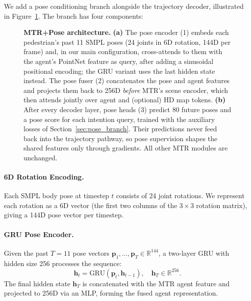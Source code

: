 \documentclass{article} %
\begin{document}
We add a pose conditioning branch alongside the trajectory decoder, illustrated
in Figure~\ref{fig:architecture}. The branch has four components:

\begin{figure}[t]
\centering
\resizebox{\linewidth}{!}{}
\caption{%
  \textbf{MTR+Pose architecture.}
  \textbf{(a)} The pose encoder (1) embeds each pedestrian's past 11 SMPL poses
  (24 joints in 6D rotation, 144D per frame) and, in our main configuration,
  cross-attends to them with the agent's PointNet feature as query, after adding
  a sinusoidal positional encoding; the GRU variant uses the last hidden state
  instead. The pose fuser (2) concatenates the pose and agent features and
  projects them back to 256D \emph{before} MTR's scene encoder, which then
  attends jointly over agent and (optional) HD map tokens.
  \textbf{(b)} After every decoder layer, pose heads (3) predict 80 future
  poses and a pose score for each intention query, trained with the auxiliary
  losses of Section~\ref{sec:pose_branch}. Their predictions never feed back into
  the trajectory pathway, so pose supervision shapes the shared features only
  through gradients. All other MTR modules are unchanged.
}
\label{fig:architecture}
\end{figure}

\paragraph{6D Rotation Encoding.}
Each SMPL body pose at timestep $t$ consists of 24 joint rotations. We represent
each rotation as a 6D vector \citep{zhou2019continuity} (the first two columns of
the $3{\times}3$ rotation matrix), giving a 144D pose vector per timestep.

\paragraph{GRU Pose Encoder.}
Given the past $T=11$ pose vectors $\mathbf{p}_1, \ldots, \mathbf{p}_{T} \in \mathbb{R}^{144}$,
a two-layer GRU with hidden size 256 processes the sequence:
\begin{equation}
  \mathbf{h}_t = \text{GRU}(\mathbf{p}_t, \mathbf{h}_{t-1}), \quad \mathbf{h}_T \in \mathbb{R}^{256}.
\end{equation}
The final hidden state $\mathbf{h}_T$ is concatenated with the MTR agent feature
and projected to 256D via an MLP, forming the fused agent representation.
\end{document}
